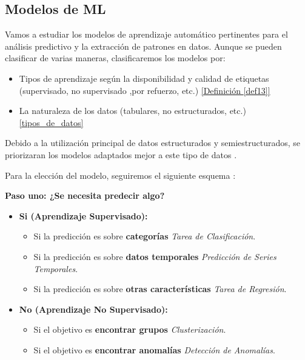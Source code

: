 \subsection{Modelos de ML}

Vamos a estudiar los modelos de aprendizaje automático pertinentes para el análisis predictivo y la extracción de patrones en datos. Aunque se pueden clasificar de varias maneras, clasificaremos los modelos por:
\begin{itemize}
	\item Tipos de aprendizaje según la disponibilidad y calidad de etiquetas (supervisado, no supervisado ,por refuerzo, etc.) \hyperref[def13]{[Definición \ref*{def13}]}
	\item La naturaleza de los datos (tabulares, no estructurados, etc.) \ref{tipos_de_datos}
\end{itemize}
Debido a la utilización principal de datos estructurados y semiestructurados, se priorizaran los modelos adaptados mejor a este tipo de datos \citep{Fowdur2021}.

Para la elección del modelo, seguiremos el siguiente esquema \citep{Jason2024MLTypes}:

\textbf{Paso uno: ¿Se necesita predecir algo?}
	\begin{itemize}
		\item \textbf{Si (Aprendizaje Supervisado):}
		\begin{itemize}
			\item Si la predicción es sobre \textbf{categorías} \textrightarrow \space \textit{Tarea de Clasificación}.
			\item Si la predicción es sobre \textbf{datos temporales} \textrightarrow \space \textit{Predicción de Series Temporales}.
			\item Si la predicción es sobre \textbf{otras características} \textrightarrow \space \textit{Tarea de Regresión}.
		\end{itemize}
		\item \textbf{No (Aprendizaje No Supervisado):}
		\begin{itemize}
			\item Si el objetivo es \textbf{encontrar grupos} \textrightarrow \space \textit{Clusterización}.
			\item Si el objetivo es \textbf{encontrar anomalías} \textrightarrow \space \textit{Detección de Anomalías}.
		\end{itemize}
	\end{itemize}
	
